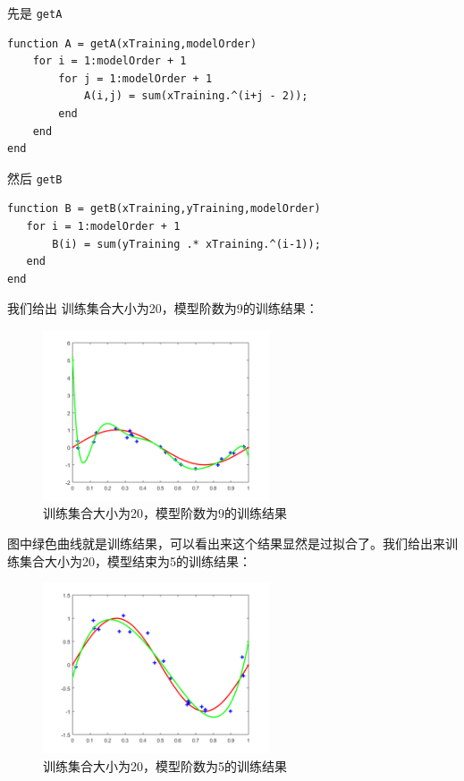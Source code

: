 \documentclass[10pt,a4paper,UTF8]{article}
\begin{document}
先是 \texttt{getA}
\lstset{language=matlab,label= ,caption= ,captionpos=b,firstnumber=1,numbers=left}
\begin{lstlisting}
function A = getA(xTraining,modelOrder)
    for i = 1:modelOrder + 1
        for j = 1:modelOrder + 1
            A(i,j) = sum(xTraining.^(i+j - 2));
        end
    end
end
\end{lstlisting}
然后 \texttt{getB}
\lstset{language=matlab,label= ,caption= ,captionpos=b,firstnumber=1,numbers=left}
\begin{lstlisting}
function B = getB(xTraining,yTraining,modelOrder)
   for i = 1:modelOrder + 1
       B(i) = sum(yTraining .* xTraining.^(i-1));
   end
end
\end{lstlisting}

我们给出 训练集合大小为20，模型阶数为9的训练结果：
\begin{figure}[htbp]
\centering
\includegraphics[width=0.6\textwidth]{../../img/computer_prml/20170521figure3.png}
\caption{\label{fig:org70e93f0}
训练集合大小为20，模型阶数为9的训练结果}
\end{figure}

图中绿色曲线就是训练结果，可以看出来这个结果显然是过拟合了。我们给出来训练集合大小为20，模型结束为5的训练结果：
\begin{figure}[htbp]
\centering
\includegraphics[width=0.6\textwidth]{../../img/computer_prml/20170521figure4.png}
\caption{\label{fig:org85b7169}
训练集合大小为20，模型阶数为5的训练结果}
\end{figure}
\end{document}
